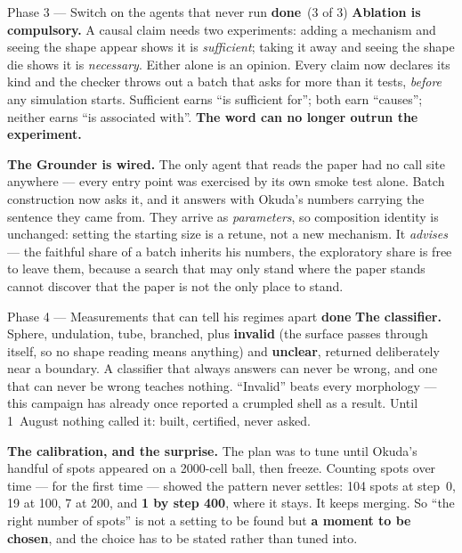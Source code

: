 \documentclass[11pt,a4paper]{article}
\newcommand{\dn}{\textcolor{good}{\textbf{done}}}
\begin{document}
\begin{phasebox}{Phase 3 --- Switch on the agents that never run \hfill \dn\ (3 of 3)}
\textbf{Ablation is compulsory.} A causal claim needs two experiments: adding a mechanism and
seeing the shape appear shows it is \emph{sufficient}; taking it away and seeing the shape die
shows it is \emph{necessary}. Either alone is an opinion. Every claim now declares its kind and the
checker throws out a batch that asks for more than it tests, \emph{before} any simulation starts.
Sufficient earns ``is sufficient for''; both earn ``causes''; neither earns ``is associated with''.
\textbf{The word can no longer outrun the experiment.}

\textbf{The Grounder is wired.} The only agent that reads the paper had no call site anywhere ---
every entry point was exercised by its own smoke test alone. Batch construction now asks it, and it
answers with Okuda's numbers carrying the sentence they came from. They arrive as \emph{parameters},
so composition identity is unchanged: setting the starting size is a retune, not a new mechanism.
It \emph{advises} --- the faithful share of a batch inherits his numbers, the exploratory share is
free to leave them, because a search that may only stand where the paper stands cannot discover
that the paper is not the only place to stand.
\end{phasebox}

\begin{phasebox}{Phase 4 --- Measurements that can tell his regimes apart \hfill \dn}
\textbf{The classifier.} Sphere, undulation, tube, branched, plus \textbf{invalid} (the surface
passes through itself, so no shape reading means anything) and \textbf{unclear}, returned
deliberately near a boundary. A classifier that always answers can never be wrong, and one that can
never be wrong teaches nothing. ``Invalid'' beats every morphology --- this campaign has already
once reported a crumpled shell as a result. Until 1~August nothing called it: built, certified,
never asked.

\textbf{The calibration, and the surprise.} The plan was to tune until Okuda's handful of spots
appeared on a 2000-cell ball, then freeze. Counting spots over time --- for the first time ---
showed the pattern never settles: 104 spots at step~0, 19 at 100, 7 at 200, and \textbf{1 by step
400}, where it stays. It keeps merging. So ``the right number of spots'' is not a setting to be
found but \textbf{a moment to be chosen}, and the choice has to be stated rather than tuned into.
\end{phasebox}
\end{document}
